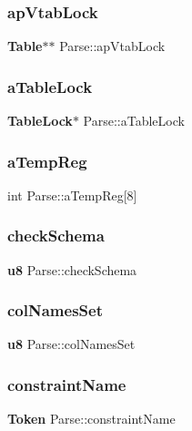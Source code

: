 \subsubsection{apVtabLock}
{\footnotesize\ttfamily \textbf{ Table}$\ast$$\ast$ Parse\+::ap\+Vtab\+Lock}

\mbox{\label{struct_parse_ae8e553d660dc69d285945d3db8f127c7}} 
\subsubsection{aTableLock}
{\footnotesize\ttfamily \textbf{ Table\+Lock}$\ast$ Parse\+::a\+Table\+Lock}

\mbox{\label{struct_parse_ae2bd2e74d0caaab7a741d17b62f01ebc}} 
\subsubsection{aTempReg}
{\footnotesize\ttfamily int Parse\+::a\+Temp\+Reg[8]}

\mbox{\label{struct_parse_a13b660ed90fc83565aa542a10549ec9f}} 
\subsubsection{checkSchema}
{\footnotesize\ttfamily \textbf{ u8} Parse\+::check\+Schema}

\mbox{\label{struct_parse_a4c71fde634168abc1e3e32c70704b1ac}} 
\subsubsection{colNamesSet}
{\footnotesize\ttfamily \textbf{ u8} Parse\+::col\+Names\+Set}

\mbox{\label{struct_parse_a40cbce90eedbd57143416c8bc28fec46}} 
\subsubsection{constraintName}
{\footnotesize\ttfamily \textbf{ Token} Parse\+::constraint\+Name}

\mbox{\label{struct_parse_a7c0b37cf797fd157234cb2e306cba2e4}} 
